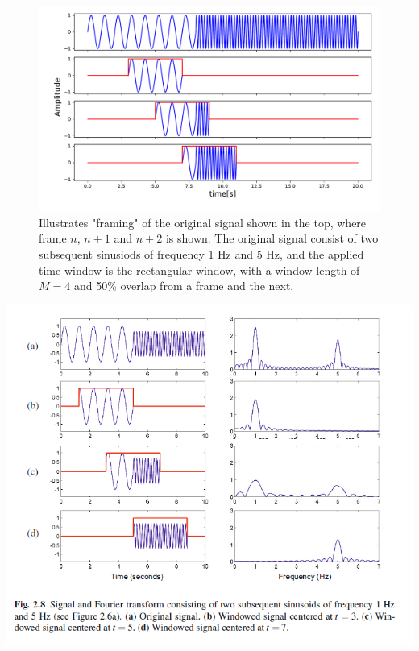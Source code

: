 \begin{figure}
    \centering
    \includegraphics[width=\textwidth]{figures/overlapfigure.pdf}
    \caption{Illustrates "framing" of the original signal shown in the top, where frame $n$, $n+1$ and $n+2$ is shown. The original signal consist of two subsequent sinusiods of frequency 1 Hz and 5 Hz, and the applied time window is the rectangular window, with a window length of $M=4$ and 50\% overlap from a frame and the next. }
    \label{fig:overlap}
\end{figure}
\includegraphics[scale=0.7]{figures/window.PNG}\\

